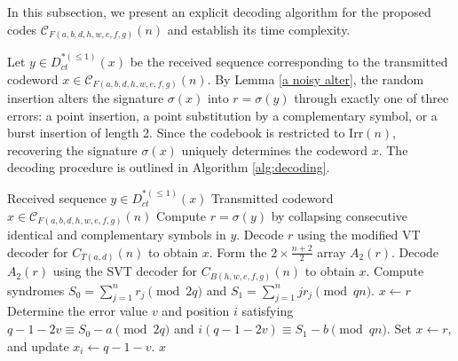 \documentclass[pdflatex,sn-mathphys-num]{sn-jnl}
\theoremstyle{theorem}%
\theoremstyle{definition}
\theoremstyle{construction}
\newtheorem{open problem}{Open problem}
\begin{document}
In this subsection, we present an explicit decoding algorithm for the proposed codes $\mathcal{C}_{F(a,b,d,h,w,e,f,g)}(n)$ and establish its time complexity. 

Let $y \in D_{ct}^{*(\le 1)}(x)$ be the received sequence corresponding to the transmitted codeword $x \in \mathcal{C}_{F(a,b,d,h,w,e,f,g)}(n)$. By Lemma \ref{a noisy alter}, the random insertion alters the signature $\sigma(x)$ into $r = \sigma(y)$ through exactly one of three errors: a point insertion, a point substitution by a complementary symbol, or a burst insertion of length 2. Since the codebook is restricted to $\mathrm{Irr}(n)$, recovering the signature $\sigma(x)$ uniquely determines the codeword $x$. The decoding procedure is outlined in Algorithm \ref{alg:decoding}.

\begin{algorithm}[htbp]
	\caption{Decoding for $\mathcal{C}_{F(a,b,d,h,w,e,f,g)}(n)$}
	\label{alg:decoding}
	\begin{algorithmic}[1]
		\Require Received sequence $y \in D_{ct}^{*(\le 1)}(x)$
		\Ensure Transmitted codeword $x \in \mathcal{C}_{F(a,b,d,h,w,e,f,g)}(n)$
		\State Compute $r = \sigma(y)$ by collapsing consecutive identical and complementary symbols in $y$.
		\State
		\State Decode $r$ using the modified VT decoder for $C_{T(a,d)}(n)$ to obtain $x$.
		\State
		\State Form the $2 \times \frac{n+2}{2}$ array $A_2(r)$.
		\State Decode $A_2(r)$ using the SVT decoder for $C_{B(h,w,e,f,g)}(n)$ to obtain $x$.
		\State Compute syndromes $S_0 = \sum_{j=1}^{n} r_j \pmod{2q}$ and $S_1 = \sum_{j=1}^{n} j r_j \pmod{qn}$.
		\State $x \leftarrow r$ 
		\Else
		\State 
		\State Determine the error value $v$ and position $i$ satisfying $q - 1 - 2v \equiv S_0 - a \pmod{2q}$ and $i(q - 1 - 2v) \equiv S_1 - b \pmod{qn}$.
		\State Set $x \leftarrow r$, and update $x_i \leftarrow q - 1 - v$.
		\EndIf
		\EndIf
		\State \Return $x$
	\end{algorithmic}
\end{algorithm}
\end{document}

